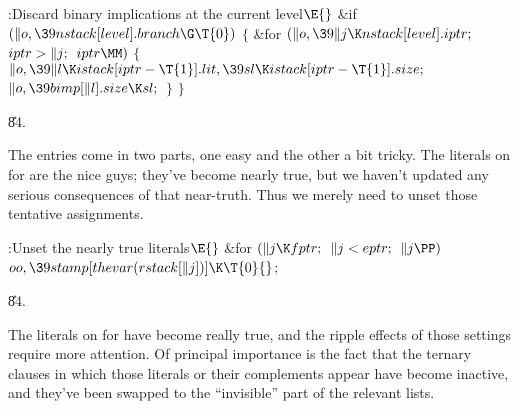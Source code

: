 \Y\B\4:Discard binary implications at the current level\X${}\E{}$\6
\&{if} ${}(\|o,\39\\{nstack}[\\{level}].\\{branch}\G\T{0}){}$\5
${}\{{}$\1\6
\&{for} ${}(\|o,\39\|j\K\\{nstack}[\\{level}].\\{iptr};{}$ ${}\\{iptr}>\|j;{}$
${}\\{iptr}\MM){}$\5
${}\{{}$\1\6
${}\|o,\39\|l\K\\{istack}[\\{iptr}-\T{1}].\\{lit},\39\\{sl}\K\\{istack}[%
\\{iptr}-\T{1}].\\{size};{}$\6
${}\|o,\39\\{bimp}[\|l].\\{size}\K\\{sl};{}$\6
\4${}\}{}$\2\6
\4${}\}{}$\2\par
\U84.\fi

The  entries come in two parts, one easy and
the other
a bit tricky. The literals on  for
 are the nice guys; they've become nearly true,
but we haven't
updated any serious consequences of that near-truth. Thus we merely need to
unset those tentative assignments.

\Y\B\4:Unset the nearly true literals\X${}\E{}$\6
\&{for} ${}(\|j\K\\{fptr};{}$ ${}\|j<\\{eptr};{}$ ${}\|j\PP){}$\1\5
${}\\{oo},\39\\{stamp}[\\{thevar}(\\{rstack}[\|j])]\K\T{0}{}$;\2\par
\U84.\fi

The literals on  for  have become really true,
and the ripple effects of those settings require more attention.
Of principal importance is the fact that the ternary clauses in which
those literals or their complements appear have become inactive,
and they've been swapped to the ``invisible'' part of the relevant
 lists.

